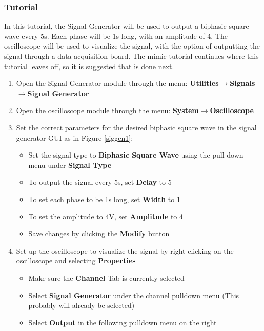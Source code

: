 \subsubsection{Tutorial}
\label{siggen tutorial}
In this tutorial, the Signal Generator will be used to output a biphasic square wave every 5s. Each phase will be 1s long, with an amplitude of 4. The oscilloscope will be used to visualize the signal, with the option of outputting the signal through a data acquisition board. The mimic tutorial continues where this tutorial leaves off, so it is suggested that is done next.

\begin{enumerate}
\item Open the Signal Generator module through the menu: \textbf{Utilities}$\rightarrow$\textbf{Signals}$\rightarrow$\textbf{Signal Generator}
\item Open the oscilloscope module through the menu: \textbf{System}$\rightarrow$\textbf{Oscilloscope}
\item Set the correct parameters for the desired biphasic square wave in the signal generator GUI as in Figure \ref{siggen1}:
  \begin{itemize}
  \item Set the signal type to \textbf{Biphasic Square Wave} using the pull down menu under \textbf{Signal Type}
  \item To output the signal every 5s, set \textbf{Delay} to 5
  \item To set each phase to be 1s long, set \textbf{Width} to 1
  \item To set the amplitude to 4V, set \textbf{Amplitude} to 4
  \item Save changes by clicking the \textbf{Modify} button
  \end{itemize}
\item Set up the oscilloscope to visualize the signal by right clicking on the oscilloscope and selecting \textbf{Properties}
  \begin{itemize}
  \item Make sure the \textbf{Channel} Tab is currently selected
  \item Select \textbf{Signal Generator} under the channel pulldown menu (This probably will already be selected)
  \item Select \textbf{Output} in the following pulldown menu on the right

\end{itemize}
\end{enumerate}

